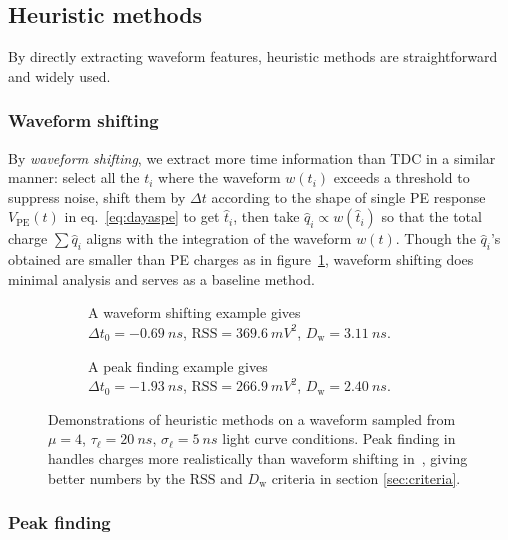 \subsection{Heuristic methods}
By directly extracting waveform features, heuristic methods are straightforward and widely used. 

\subsubsection{Waveform shifting}
\label{sec:shifting}
By \textit{waveform shifting}, we extract more time information than TDC in a similar manner: select all the $t_i$ where the waveform $w(t_i)$ exceeds a threshold to suppress noise, shift them by $\Delta t$ according to the shape of single PE response $V_\mathrm{PE}(t)$ in eq.~\eqref{eq:dayaspe} to get $\hat{t}_i$, then take $\hat{q}_i \propto w(\hat{t}_i)$ so that the total charge $\sum \hat{q}_i$ aligns with the integration of the waveform $w(t)$.  Though the $\hat{q}_i$'s obtained are smaller than PE charges as in figure~\ref{fig:shifting}, waveform shifting does minimal analysis and serves as a baseline method.

\begin{figure}[H]
  \begin{subfigure}{.5\textwidth}
    \centering
    \resizebox{\textwidth}{!}{}
    \caption{\label{fig:shifting} A waveform shifting example gives \\ $\Delta t_0=\SI{-0.69}{ns}$, $\mathrm{RSS}=\SI{369.6}{mV^2}$, $D_\mathrm{w}=\SI{3.11}{ns}$.}
  \end{subfigure}
  \begin{subfigure}{.5\textwidth}
    \centering
    \resizebox{\textwidth}{!}{}
    \caption{\label{fig:peak} A peak finding example gives \\ $\Delta t_0=\SI{-1.93}{ns}$, $\mathrm{RSS}=\SI{266.9}{mV^2}$, $D_\mathrm{w}=\SI{2.40}{ns}$.}
  \end{subfigure}
  \caption{\label{fig:method}Demonstrations of heuristic methods on a waveform sampled from $\mu=4$, $\tau_\ell=\SI{20}{ns}$, $\sigma_\ell=\SI{5}{ns}$ light curve conditions.  Peak finding in~ handles charges more realistically than waveform shifting in~, giving better numbers by the $\mathrm{RSS}$ and $D_\mathrm{w}$ criteria in section \ref{sec:criteria}.}
\end{figure}

\subsubsection{Peak finding}
\label{sec:findpeak}

